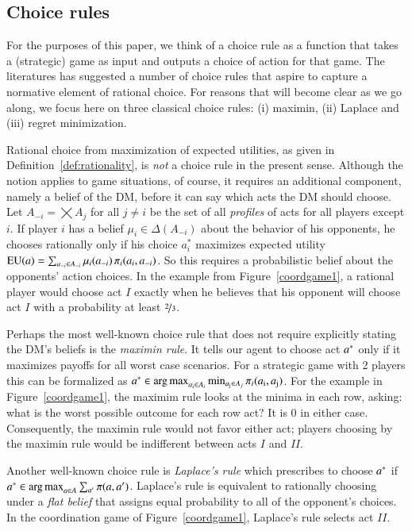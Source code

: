 \documentclass[fleqn,reqno,11pt]{article}
\begin{document}
\subsection{Choice rules} 
\label{sec:choice-rules}

For the purposes of this paper, we think of a choice rule as a function that takes a
(strategic) game as input and outputs a choice of action for that game. The literatures has
suggested a number of choice rules that aspire to capture a normative element of rational
choice. For reasons that will become clear as we go along, we focus here on three classical
choice rules: (i) maximin, (ii) Laplace and (iii) regret minimization.

Rational choice from maximization of expected utilities, as given in
Definition~\ref{def:rationality}, is \emph{not} a choice rule in the present sense. Although
the notion applies to game situations, of course, it requires an additional component, namely a
belief of the DM, before it can say which acts the DM should choose. Let
$A_{-i} = \bigtimes A_j$ for all $j \neq i$ be the set of all \emph{profiles} of acts for all
players except $i$. If player $i$ has a belief $\mu_i \in \Delta(A_{-i})$ about the behavior of
his opponents, he chooses rationally only if his choice $a^*_i$ maximizes expected utility
$\operatorname{EU}(a) = \sum_{a_{-i} \in A_{-i}} \mu_i(a_{-i}) \thinspace \pi_i(a_i, a_{-i})$. So this
requires a probabilistic belief about the opponents' action choices. In the example from
Figure~\ref{coordgame1}, a rational player would choose act $I$ exactly when he believes that
his opponent will choose act $I$ with a probability at least $\nicefrac{2}{3}$.

Perhaps the most well-known choice rule that does not require explicitly stating the DM's
beliefs is the \emph{maximin rule}. It tells our agent to choose act $a^*$ only if it
maximizes payoffs for all worst case scenarios. For a strategic game with 2 players this can be
formalized as
$a^* \in \operatorname*{arg\,max}_{a_{\text{i}} \in A_i} \min_{a_{\text{j}} \in A_j} \pi_i(a_{\text{i}},
a_{\text{j}})$.
For the example in Figure~\ref{coordgame1}, the maximim rule looks at the minima in each row,
asking: what is the worst possible outcome for each row act? It is $0$ in either
case. Consequently, the maximin rule would not favor either act; players choosing by the
maximin rule would be indifferent between acts $I$ and $II$.

Another well-known choice rule is \emph{Laplace's rule} which prescribes to choose $a^*$ if
$a^* \in \operatorname*{arg\,max}_{a \in A} \sum_{a'} \pi(a, a')$. Laplace's rule is equivalent to rationally
choosing under a \emph{flat belief} that assigns equal probability to all of the opponent's
choices. In the coordination game of Figure~\ref{coordgame1}, Laplace's rule selects act $II$.
\end{document}
